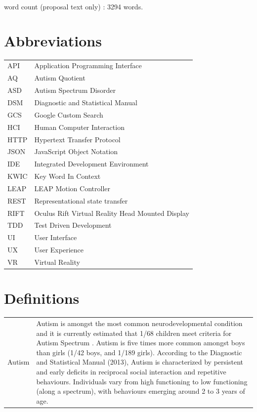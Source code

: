 \documentclass[a4paper, 11pt]{article}
\begin{document}
\begin{center}
word count (proposal text only) : 3294 words.
\end{center}

\clearpage
\tableofcontents
\clearpage

\section*{Abbreviations}
\begin{tabular}{l l }
API & Application Programming Interface\\
AQ & Autism Quotient\\
ASD & Autism Spectrum Disorder\\
DSM & Diagnostic and Statistical Manual\\
GCS & Google Custom Search\\
HCI & Human Computer Interaction\\
HTTP & Hypertext Transfer Protocol\\
JSON & JavaScript Object Notation\\
IDE & Integrated Development Environment\\
KWIC & Key Word In Context\\
LEAP & LEAP Motion Controller\\
REST & Representational state transfer\\
RIFT & Oculus Rift Virtual Reality Head Mounted Display\\
TDD & Test Driven Development\\
UI & User Interface\\
UX & User Experience\\
VR & Virtual Reality\\
\end{tabular}

\section*{Definitions}

\begin{tabular}{l p{15cm}  }
Autism & Autism is amongst the most common neurodevelopmental condition and it is currently estimated that 1/68 children meet criteria for Autism Spectrum \cite{CDC}. Autism is five times more common amongst boys than girls (1/42 boys, and 1/189 girls). According to the Diagnostic and Statistical Manual (2013), Autism is characterized by persistent and early deficits in reciprocal social interaction and repetitive behaviours. Individuals vary from high functioning to low functioning (along a spectrum), with behaviours emerging around 2 to 3 years of age.
\end{tabular}
\clearpage
\end{document}
